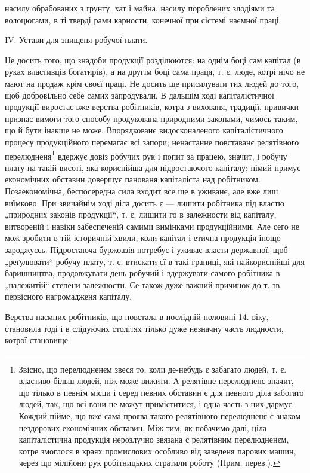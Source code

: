 \parcont{}
насилу обрабованих з ґрунту, хат і майна, насилу пороблених
злодіями та волоцюгами, в ті тверді рами карности,
конечної при сістемі наємної праці.

IV.    Устави для знищеня робучої плати.

Не досить того, що знадоби продукції розділюются:
на однім боці сам капітал (в руках властивців богатирів),
а на другім боці сама праця, т. є. люде, котрі нічо не мают
на продаж крім своєї праці. Не досить ще присилувати
тих людей до того, щоб добровільно себе самих запродували.
В дальшім ході капіталістичної продукції виростає
вже верства робітників, котра з вихованя, традиції, привички
признає вимоги того способу продукована природними законами,
чимось таким, що й бути інакше не може. Впорядкованє
видосконаленого капіталістичного процесу продукційного
перемагає всі запори; ненастанне повставанє релятівного
перелюдненя\footnote*{
Звісно, що перелюдненєм звеся то, коли де-небудь є забагато
людей, т. є. властиво більш людей, ніж може вижити. А релятівне перелюдненє
значит, що тілько в певнім місци і серед певних обставин є для
певного діла забогато людей, так, що всі вони не можут приміститися,
і одна часть з них дармує. Кождий пійме, що вже сама проява такого
релятівного перелюдненя є знаком нездорових економічних обставин.
Між тим, як побачимо далі, ціла капіталістична продукція нерозлучно
звязана с релятівним перелюдненєм, котре змоглося в краях промислових
особливо від заведеня парових машин, через що мілійони рук робітницьких
стратили роботу (Прим. перев.).
} вдержує довіз робучих рук і попит
за працею, значит, і робучу плату на такій висоті, яка кориснійша
для підростаючого капіталу; німий примус економічних
обставин довершує панованя капіталіста над робітником.
Позаекономічна, беспосередна сила входит все ще
в уживанє, але вже лиш виїмково. При звичайнім ході діла
досить є — лишити робітника під властю „природних законів
продукції“, т. є. лишити го в залежности від капіталу,
витвореній і навіки забеспеченій самими вимінками
продукційними. Але сего не мож зробити в тій історичній
хвили, коли капітал і етична продукція інощо зароджуєсь.
Підростаюча буржоазія потребує і уживає власти державної,
щоб „реґулювати“ робучу плату, т. є. втискати єї в такі
границі, які найкориснійші для баришництва, продовжувати
день робучий і вдержувати самого робітника в „належитій“
степени залежности. Се також дуже важний причинок до
т. зв. первісного нагромадженя капіталу.

Верства наємних робітників, що повстала в послідній
половині 14. віку, становила тоді і в слідуючих столітях
тілько дуже незначну часть людности, котрої становище
\parbreak{}
